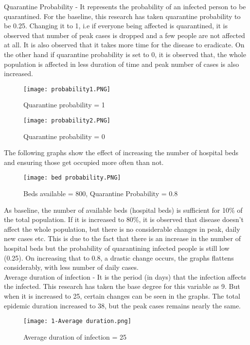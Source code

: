\documentclass[conference]{IEEEtran}
\begin{document}
    Quarantine Probability - It represents the probability of an infected person to be quarantined. For the baseline, this research has taken quarantine probability to be 0.25. Changing it to 1, i.e if everyone being affected is quarantined, it is observed that number of peak cases is dropped and a few people are not affected at all. It is also observed that it takes more time for the disease to eradicate. On the other hand if quarantine probability is set to 0, it is observed that, the whole population is affected in less duration of time and peak number of cases is also increased.
    \begin{figure}[!h]
        		\texttt{[image: probability1.PNG]}
        		\caption{Quarantine probability = 1}
    \end{figure}
    \begin{figure}[!h]
        		\texttt{[image: probability2.PNG]}
        		\caption{Quarantine probability = 0}
    \end{figure}
    
    The following graphs show the effect of increasing the number of hospital  beds and ensuring those get occupied more often than not.\\
    \begin{figure}[!h]
		\texttt{[image: bed probability.PNG]}
		\caption{Beds available = 800, Quarantine Probability = 0.8}
    \end{figure}
    
    As baseline, the number of available beds (hospital beds) is sufficient for 10\% of the total population. If it is increased to 80\%, it is observed that disease doesn't affect the whole population, but there is no considerable changes in peak, daily new cases etc. This is due to the fact that there is an increase in the number of hospital beds but the probability of quarantining infected people is still low (0.25). On increasing that to 0.8, a drastic change occurs, the graphs flattens considerably, with less number of daily cases.\\
    
    Average duration of infection - It is the period (in days) that the infection affects the infected. This research has taken the base degree for this variable as 9. But when it is increased to 25, certain changes can be seen in the graphs. The total epidemic duration increased to 38, but the peak cases remains nearly the same.
    \begin{figure}[!h]
		\texttt{[image: 1-Average duration.png]}
		\caption{Average duration of infection = 25}
    \end{figure}
    
\end{document}

